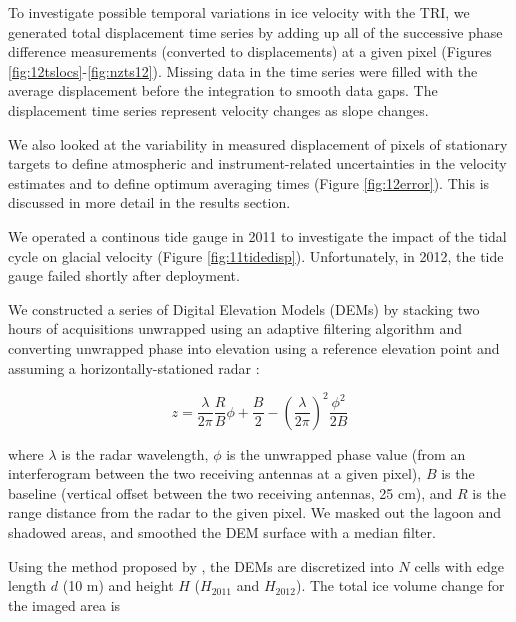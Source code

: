 \documentclass[review]{igs}
\begin{document}
  
To investigate possible temporal variations in ice velocity with the TRI, we generated total displacement time series by adding up all of the successive phase difference measurements (converted to displacements) at a given pixel (Figures \ref{fig:12tslocs}-\ref{fig:nzts12}). Missing data in the time series were filled with the average displacement before the integration to smooth data gaps. The displacement time series represent velocity changes as slope changes.

We also looked at the variability in measured displacement of pixels of stationary targets to define atmospheric and instrument-related uncertainties in the velocity estimates and to define optimum averaging times (Figure \ref{fig:12error}). This is discussed in more detail in the results section.


We operated a continous tide gauge in 2011 to investigate the impact of the tidal cycle on glacial velocity (Figure \ref{fig:11tidedisp}). Unfortunately, in 2012, the tide gauge failed shortly after deployment. 


We constructed a series of Digital Elevation Models (DEMs) by stacking two hours of acquisitions unwrapped using an adaptive filtering algorithm \citep{goldstein1998radar} and converting unwrapped phase into elevation using a reference elevation point and assuming a horizontally-stationed radar \citep{strozzi2012topography}:
  
\begin{equation}z=\frac{\lambda}{2\pi}\frac{R}{B}\phi+\frac{B}{2}-\left(\frac{\lambda}{2\pi}\right)^2 \frac{\phi^2}{2B}\end{equation}
 
where $\lambda$ is the radar wavelength, $\phi$ is the unwrapped phase value (from an interferogram between the two receiving antennas at a given pixel), $B$ is the baseline (vertical offset between the two receiving antennas, 25 cm), and $R$ is the range distance from the radar to the given pixel. We masked out the lagoon and shadowed areas, and smoothed the DEM surface with a median filter. 


Using the method proposed by \citet{etzelmuller1993mass}, the DEMs are discretized into $N$ cells with edge length $d$ (10 m) and height $H$ ($H_{2011}$ and $H_{2012}$). The total ice volume change for the imaged area is
  
\end{document}
